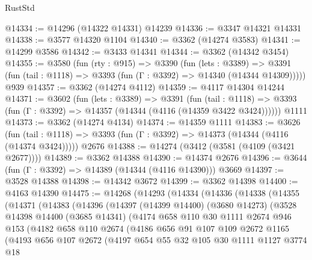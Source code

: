 \begin{lexlean}{RustStd}
\begin{coremodule}
@14334 := @14296 (@14322 @14331) @14239
@14336 := @3347 @14321 @14331
@14338 := @3577 @14320 @1104
@14340 := @3362 (@14274 @3583)
@14341 := @14299 @3586
@14342 := @3433 @14341
@14344 := @3362 (@14342 @3454)
@14355 := @3580
    (fun (rty : @915) =>
    @3390
      (fun (lets : @3389) =>
      @3391 (fun (tail : @1118) => @3393 (fun (Γ : @3392) => @14340 (@14344 @14309)))))
    @939
@14357 := @3362 (@14274 @4112)
@14359 := @4117 @14304 @14244
@14371 := @3602
    (fun (lets : @3389) =>
    @3391
      (fun (tail : @1118) =>
      @3393 (fun (Γ : @3392) => @14357 (@14344 (@4116 (@14359 @3422 @3424))))))
    @1111
@14373 := @3362 (@14274 @4134)
@14374 := @14359 @1111
@14383 := @3626
    (fun (tail : @1118) => @3393 (fun (Γ : @3392) => @14373 (@14344 (@4116 (@14374 @3424)))))
    @2676
@14388 := @14274 (@3412 (@3581 (@4109 (@3421 @2677))))
@14389 := @3362 @14388
@14390 := @14374 @2676
@14396 := @3644 (fun (Γ : @3392) => @14389 (@14344 (@4116 @14390))) @3669
@14397 := @3528 @14388
@14398 := @14342 @3672
@14399 := @3362 @14398
@14400 := @4163 @14390
@14475 := @14268
    (@14293
      (@14334
        (@14336
          (@14338
            (@14355
              (@14371
                (@14383
                  (@14396
                    (@14397
                      (@14399 @14400)
                      (@3680 @14273)
                      (@3528
                        @14398
                        @14400
                        (@3685 @14341)
                        (@4174
                          @658
                          @110
                          @30
                          @1111
                          @2674
                          @946
                          @153
                          (@4182
                            @658
                            @110
                            @2674
                            (@4186
                              @656
                              @91
                              @107
                              @109
                              @2672
                              @1165
                              (@4193
                                @656
                                @107
                                @2672
                                (@4197
                                  @654
                                  @55
                                  @32
                                  @105
                                  @30
                                  @1111
                                  @1127
                                  @3774
                                  @18

\end{coremodule}
\end{lexlean}
